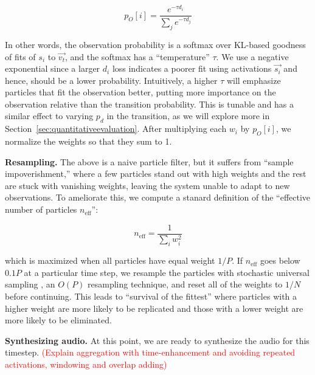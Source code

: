 \documentclass{article}
\newcommand{\ChrisEdit}[1]{\textcolor{red}{(#1)}}
\begin{document}
\begin{equation}
    \label{eq:observationprob}
    p_O[i] = \frac{e^{-\tau d_i}}{ \sum_{j} e^{-\tau d_j}}
\end{equation}

In other words, the observation probability is a softmax over KL-based goodness of fits of $s_i$ to $\vec{v_t}$, and the softmax has a ``temperature'' $\tau$.  We use a negative exponential since a larger $d_i$ loss indicates a poorer fit using activations $\vec{s_i}$ and hence, should be a lower probability.  Intuitively, a higher $\tau$ will emphasize particles that fit the observation better, putting more importance on the observation relative than the transition probability.  This is tunable and has a similar effect to varying $p_d$ in the transition, as we will explore more in Section~\ref{sec:quantitativeevaluation}.  After multiplying each $w_i$ by $p_O[i]$, we normalize the weights so that they sum to 1.  

\textbf{Resampling.} The above is a naive particle filter, but it suffers from ``sample impoverishment,'' where a few particles stand out with high weights and the rest are stuck with vanishing weights, leaving the system unable to adapt to new observations.  To ameliorate this, we compute a stanard definition of the ``effective number of particles $n_{\text{eff}}$'':

\begin{equation}
    n_{\text{eff}} = \frac{1}{\sum_{i} w_i^2}
\end{equation}


which is maximized when all particles have equal weight $1/P$.  If $n_{\text{eff}}$ goes below $0.1P$ at a particular time step, we resample the particles with stochastic universal sampling \cite{kitagawa1996monte, carpenter1999improved}, an $O(P)$ resampling technique, and reset all of the weights to $1/N$ before continuing.  This leads to ``survival of the fittest'' where particles with a higher weight are more likely to be replicated and those with a lower weight are more likely to be eliminated.

\textbf{Synthesizing audio.} At this point, we are ready to synthesize the audio for this timestep. \ChrisEdit{Explain aggregation with time-enhancement and avoiding repeated activations, windowing and overlap adding}


\end{document}
